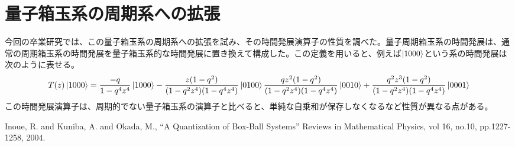 \documentclass[10pt]{jarticle}
\begin{document}
\vspace{-0.5cm}
\section{量子箱玉系の周期系への拡張}
今回の卒業研究では、この量子箱玉系の周期系への拡張を試み、その時間発展演算子の性質を調べた。量子周期箱玉系の時間発展は、通常の周期箱玉系の時間発展を量子箱玉系的な時間発展に置き換えて構成した。この定義を用いると、例えば$\ket{1000}$という系の時間発展は次のように表せる。
$$T(z)\ket{1000} =
\frac{-q}{1 - q^{4} z^{4}}\ket{1000} - \frac{z (1 - q^{2})}{(1-q^{2} z^{4})(1 - q^{4} z^{4})}\ket{0100}
\frac{qz^2 (1 - q^{2})}{(1-q^{2} z^{4})(1 - q^{4} z^{4})}\ket{0010} + \frac{q^2z^3 (1 - q^{2})}{(1-q^{2} z^{4})(1 - q^{4} z^{4})}\ket{0001}
$$
この時間発展演算子は、周期的でない量子箱玉系の演算子と比べると、単純な自乗和が保存しなくなるなど性質が異なる点がある。

\begin{thebibliography}{1}
  \bibitem{} Inoue, R. and Kuniba, A. and Okada, M.,
    ``A Quantization of Box-Ball Systems'' Reviews in Mathematical Physics,
    vol 16, no.10, pp.1227-1258, 2004.
\end{thebibliography}
\end{document}
